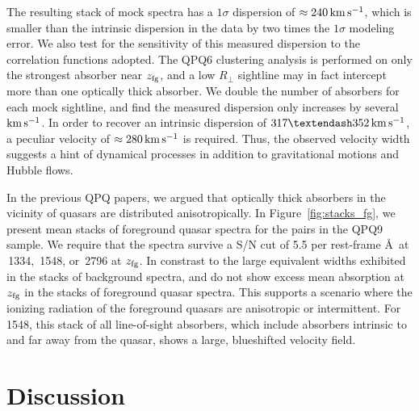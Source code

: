 \documentclass[iop]{emulateapj}
\begin{document}
The resulting stack of mock spectra has a $1\sigma$ dispersion of $\approx240\,{\rm km\,s^{-1}}$, 
which is smaller than the intrinsic dispersion in the data by two times the $1\sigma$ modeling 
error. We also test for the sensitivity of this 
measured dispersion to the correlation functions adopted. The QPQ6 clustering analysis is 
performed on only the strongest absorber near $z_{\rm fg}$, and a low $R_\perp$ sightline may in 
fact intercept more than one optically thick absorber. We double the number of absorbers for each 
mock sightline, and find the measured dispersion only increases by several ${\rm km\,s^{-1}}$. 
In order to recover an intrinsic dispersion of $317\textendash352\,{\rm km\,s^{-1}}$, a peculiar 
velocity of $\approx280\,{\rm km\,s^{-1}}$ is required. Thus, the observed velocity width suggests 
a hint of dynamical processes in addition to gravitational motions and Hubble flows. 

In the previous QPQ papers, we argued that optically thick absorbers in the vicinity of quasars 
are distributed anisotropically. In Figure~\ref{fig:stacks_fg}, we present mean stacks of 
foreground quasar spectra for the pairs in the QPQ9 sample. We require that the spectra survive a 
S/N cut of 5.5 per rest-frame \AA\ at \,1334, \,1548, or \,2796 at 
$z_{\rm fg}$. In constrast to the large equivalent widths exhibited in the stacks of background 
spectra,  and  do not show excess mean absorption at $z_{\rm fg}$ in the 
stacks of foreground quasar spectra. This supports a scenario where the ionizing radiation of the 
foreground quasars are anisotropic or intermittent. For \,1548, this stack of all 
line-of-sight absorbers, which include absorbers intrinsic to and far away from the quasar, shows 
a large, blueshifted velocity field. 

\section{Discussion}
\label{sec:discussion}
\end{document}
